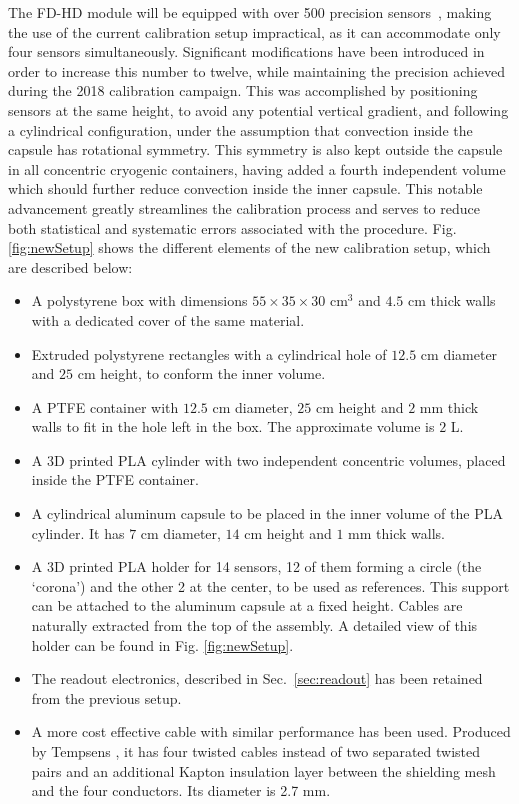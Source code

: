 \noindent The FD-HD module will be equipped with over 500 precision sensors~\cite{dune_tdr4}, making the use of the current calibration setup impractical, as it can accommodate only four sensors simultaneously. Significant modifications have been introduced in order to increase this number to twelve, while maintaining the precision achieved during the 2018 calibration campaign. This was accomplished by positioning sensors at the same height, to avoid any potential vertical gradient, and following a cylindrical configuration, under the assumption that convection inside the capsule has rotational symmetry.
This symmetry is also kept outside the capsule in all concentric cryogenic containers, having added a fourth independent volume which should further reduce convection inside the inner capsule.
This notable advancement greatly streamlines the calibration process and serves to reduce both statistical and systematic errors associated with the procedure. Fig. \ref{fig:newSetup} shows the different elements of the new calibration setup, which are described below:

\begin{itemize}
    \item A polystyrene box with dimensions $55\times35\times30$ cm$^{3}$ and $4.5$ cm thick walls with a dedicated cover of the same material.
    \item Extruded polystyrene rectangles with a cylindrical hole of $12.5$ cm diameter and $25$ cm height, to conform the inner volume.
    \item A PTFE container with $12.5$ cm diameter, $25$ cm height and $2$ mm thick walls to fit in the hole left in the box. The approximate volume is $2$ L.
    \item A 3D printed PLA cylinder with two independent concentric volumes, placed inside the PTFE container.
    \item A cylindrical aluminum capsule to be placed in the inner volume of the PLA cylinder. It has $7$ cm diameter,  $14$ cm height and $1$ mm thick walls.
    \item A 3D printed PLA holder for 14 sensors, 12 of them forming a circle (the `corona') and the other 2 at the center, to be used as references. This support can be attached to the aluminum capsule at a fixed height. Cables are naturally extracted from the top of the assembly. A detailed view of this holder can be found in Fig. \ref{fig:newSetup}.
    \item The readout electronics, described in Sec.~\ref{sec:readout} has been retained from the previous setup.
    \item A more cost effective cable with similar performance has been used. Produced by Tempsens \cite{tempsens}, it has four twisted cables instead of two separated twisted pairs and an additional Kapton insulation layer between the shielding mesh and the four conductors. Its diameter is 2.7 mm.
\end{itemize}


